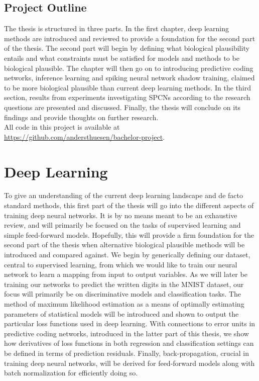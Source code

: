 \documentclass[a4paper,11pt]{article} %
\begin{document}
\subsection{Project Outline}
The thesis is structured in three parts. In the first chapter, deep learning methods are introduced and reviewed to provide a foundation for the second part of the thesis. The second part will begin by defining what biological plausibility entails and what constraints must be satisfied for models and methods to be biological plausible. The chapter will then go on to introducing predictive coding networks, inference learning and spiking neural network shadow training, claimed to be more biological plausible than current deep learning methods. In the third section, results from experiments investigating SPCNs according to the research questions are presented and discussed. Finally, the thesis will conclude on its findings and provide thoughts on further research. \\
All code in this project is available at \href{https://github.com/andersthuesen/bachelor-project}{https://github.com/andersthuesen/bachelor-project}.

\newpage

\section{Deep Learning}
To give an understanding of the current deep learning landscape and de facto standard methods, this first part of the thesis will go into the different aspects of training deep neural networks. It is by no means meant to be an exhaustive review, and will primarily be focused on the tasks of supervised learning and simple feed-forward models. Hopefully, this will provide a firm foundation for the second part of the thesis when alternative biological plausible methods will be introduced and compared against. We begin by generically defining our dataset, central to supervised learning, from which we would like to train our neural network to learn a mapping from input to output variables. As we will later be training our networks to predict the written digits in the MNIST dataset, our focus will primarily be on discriminative models and classification tasks. The method of maximum likelihood estimation as a means of optimally estimating parameters of statistical models will be introduced and shown to output the particular loss functions used in deep learning. With connections to error units in predictive coding networks, introduced in the latter part of this thesis, we show how derivatives of loss functions in both regression and classification settings can be defined in terms of prediction residuals. Finally, back-propagation, crucial in training deep neural networks, will be derived for feed-forward models along with batch normalization for efficiently doing so.
\end{document}
